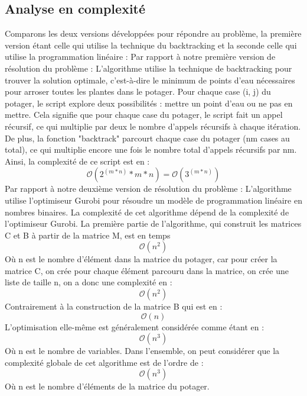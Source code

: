 \documentclass[french,a4paper]{article}
\begin{document}
\subsection{Analyse en complexité}
Comparons les deux versions développées pour répondre au problème, la première version étant celle qui utilise la technique du backtracking et la seconde celle qui utilise la programmation linéaire :
\newline
\newline Par rapport à notre première version de résolution du problème :
\newline L'algorithme utilise la technique de backtracking pour trouver la solution optimale, c'est-à-dire le minimum de points d'eau nécessaires pour arroser toutes les plantes dans le potager. Pour chaque case (i, j) du potager, le script explore deux possibilités : mettre un point d'eau ou ne pas en mettre. Cela signifie que pour chaque case du potager, le script fait un appel récursif, ce qui multiplie par deux le nombre d'appels récursifs à chaque itération.
De plus, la fonction "backtrack" parcourt chaque case du potager (nm cases au total), ce qui multiplie encore une fois le nombre total d'appels récursifs par nm.
\newline Ainsi, la complexité de ce script est en : \[\mathcal{O}(2^{(m*n)}*m*n) = \mathcal{O}(3^{(m*n)})\]
\newline Par rapport à notre deuxième version de résolution du problème :
\newline L'algorithme utilise l'optimiseur Gurobi pour résoudre un modèle de programmation linéaire en nombres binaires. La complexité de cet algorithme dépend de la complexité de l'optimiseur Gurobi.
La première partie de l'algorithme, qui construit les matrices C et B à partir de la matrice M, est en temps \[\mathcal{O}(n^2)\] Où n est le nombre d'élément dans la matrice du potager, car pour créer la matrice C, on crée pour chaque élément parcouru dans la matrice, on crée une liste de taille n, on a donc une complexité en : \[\mathcal{O}(n^2)\] Contrairement à la construction de la matrice B qui est en : \[\mathcal{O}(n)\]
L'optimisation elle-même est généralement considérée comme étant en : \[\mathcal{O}(n^3)\] Où n est le nombre de variables.
Dans l'ensemble, on peut considérer que la complexité globale de cet algorithme est de l'ordre de : \[\mathcal{O}(n^3)\] Où n est le nombre d'éléments de la matrice du potager.
\end{document}
